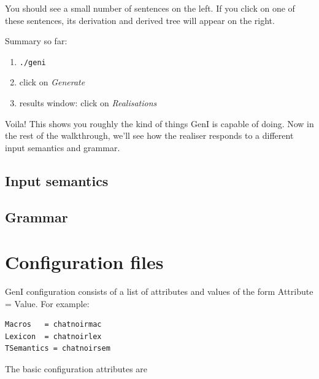 \documentclass[11pt]{article}
\newcommand{\commandline}{\texttt}
\newcommand{\commandgui}{\textit}
\begin{document}
You should see a small number of sentences on the left. If you click on
one of these sentences, its derivation and derived tree will appear on
the right.

Summary so far:

\begin{enumerate}
\item \commandline{./geni}
\item click on \commandgui{Generate}
\item results window: click on \commandgui{Realisations}
\end{enumerate}

Voila! This shows you roughly the kind of things GenI is capable of
doing.  Now in the rest of the walkthrough, we'll see how the realiser
responds to a different input semantics and grammar.

\subsection{Input semantics}

\subsection{Grammar}

%
%

\section{Configuration files}
\label{sec:configuration_files}

GenI configuration consists of a list of
attributes and values of the form Attribute = Value.  For example: 

\begin{verbatim}
Macros   = chatnoirmac
Lexicon  = chatnoirlex
TSemantics = chatnoirsem
\end{verbatim}

The basic configuration attributes are
\end{document}
